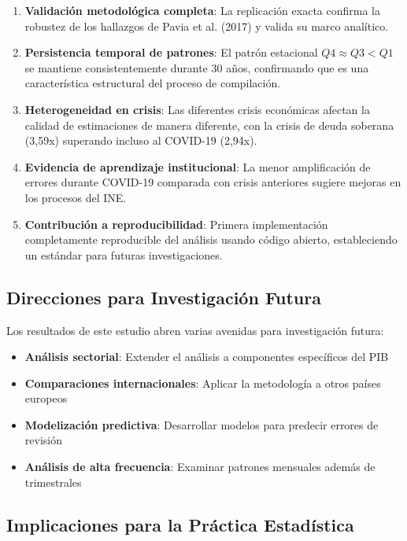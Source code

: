 \documentclass[12pt,a4paper]{article}
\begin{document}
\begin{enumerate}
\item \textbf{Validación metodológica completa}: La replicación exacta confirma la robustez de los hallazgos de Pavia et al. (2017) y valida su marco analítico.

\item \textbf{Persistencia temporal de patrones}: El patrón estacional $Q4 \approx Q3 < Q1$ se mantiene consistentemente durante 30 años, confirmando que es una característica estructural del proceso de compilación.

\item \textbf{Heterogeneidad en crisis}: Las diferentes crisis económicas afectan la calidad de estimaciones de manera diferente, con la crisis de deuda soberana (3,59x) superando incluso al COVID-19 (2,94x).

\item \textbf{Evidencia de aprendizaje institucional}: La menor amplificación de errores durante COVID-19 comparada con crisis anteriores sugiere mejoras en los procesos del INE.

\item \textbf{Contribución a reproducibilidad}: Primera implementación completamente reproducible del análisis usando código abierto, estableciendo un estándar para futuras investigaciones.
\end{enumerate}

\subsection{Direcciones para Investigación Futura}

Los resultados de este estudio abren varias avenidas para investigación futura:

\begin{itemize}
\item \textbf{Análisis sectorial}: Extender el análisis a componentes específicos del PIB
\item \textbf{Comparaciones internacionales}: Aplicar la metodología a otros países europeos
\item \textbf{Modelización predictiva}: Desarrollar modelos para predecir errores de revisión
\item \textbf{Análisis de alta frecuencia}: Examinar patrones mensuales además de trimestrales
\end{itemize}

\subsection{Implicaciones para la Práctica Estadística}
\end{document}

